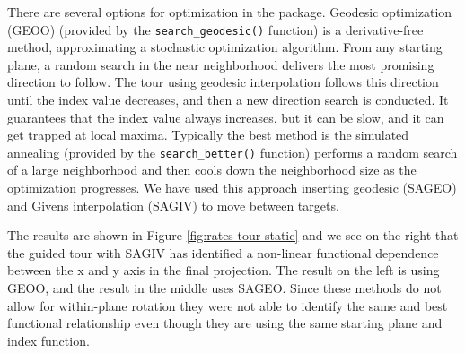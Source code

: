 There are several options for optimization in the  package. Geodesic optimization (GEOO) (provided by the \texttt{search\_geodesic()} function) is a derivative-free method, approximating a stochastic optimization algorithm. From any starting plane, a random search in the near neighborhood delivers the most promising direction to follow. The tour using geodesic interpolation follows this direction until the index value decreases, and then a new direction search is conducted. It guarantees that the index value always increases, but it can be slow, and it can get trapped at local maxima. Typically the best method is the simulated annealing (provided by the \texttt{search\_better()} function) performs a random search of a large neighborhood and then cools down the neighborhood size as the optimization progresses. We have used this approach inserting geodesic (SAGEO) and Givens interpolation (SAGIV) to move between targets.

The results are shown in Figure \ref{fig:rates-tour-static} and we see on the right that the guided tour with SAGIV has identified a non-linear functional dependence between the x and y axis in the final projection. The result on the left is using GEOO, and the result in the middle uses SAGEO. Since these methods do not allow for within-plane rotation they were not able to identify the same and best functional relationship even though they are using the same starting plane and index function.

